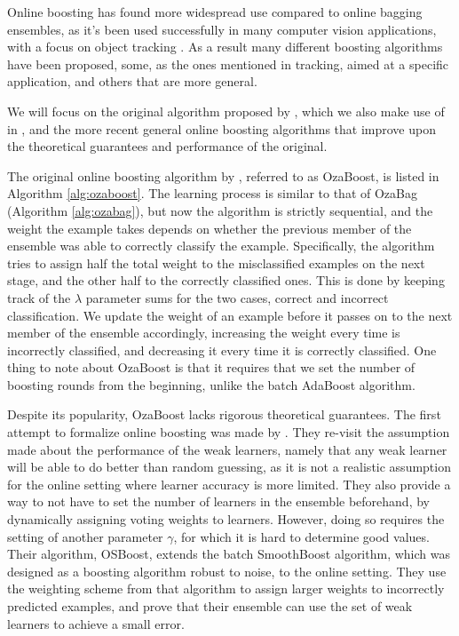 Online boosting has found more widespread use compared to online bagging ensembles,
as it's been used successfully in many computer vision applications, with a focus on
object tracking \cite{online-boost-cv4, online-boost-cv, online-boost-cv3, online-boost-cv2, online-boost-cv5, online-boost-cv-6}.
As a result many different boosting algorithms have been proposed, some, as the ones
mentioned in tracking, aimed at a specific application, and others that are more general.

We will focus on the original algorithm proposed by \citeauthor{Oza2001online},
which we also make use of in \boostvht,
and the more recent general online boosting algorithms that improve upon the
theoretical guarantees and performance of the original.

The original online boosting algorithm by \citeauthor{Oza2001online}, referred to as
OzaBoost, is listed
in Algorithm \ref{alg:ozaboost}.
The learning process is similar to that of OzaBag (Algorithm \ref{alg:ozabag}), but now the
algorithm is strictly sequential, and the weight the example takes depends on whether
the previous member of the ensemble was able to correctly classify the example.
Specifically, the algorithm tries to assign half the total weight to the misclassified
examples on the next stage, and the other half to the correctly classified ones.
This is done by keeping track of the $\lambda$ parameter sums for the two cases,
correct and incorrect classification. We update the weight of an example
before it passes on to the next member of the ensemble accordingly, increasing
the weight every time is incorrectly classified, and decreasing it every time it
is correctly classified.  One thing to note about OzaBoost is that it requires
that we set the number of boosting rounds from the beginning, unlike the
batch AdaBoost algorithm.

Despite its popularity, OzaBoost lacks rigorous theoretical guarantees.
The first attempt to formalize online boosting was made by \citet{online-boosting-theoretical}.
They re-visit the assumption made about the performance of the weak
learners, namely that any weak learner will be able to
do better than random guessing, as it is not a realistic assumption
for the online setting where learner accuracy is more limited. They also
provide a way to not have to set the number of learners in the ensemble beforehand,
by dynamically assigning voting weights to learners.
However, doing so requires the setting of another parameter $\gamma$,
for which it is hard to determine good values.
Their algorithm, OSBoost,
extends the batch SmoothBoost \cite{smoothboost} algorithm, which
was designed as a boosting algorithm robust to noise, to the online
setting. They use the weighting scheme from that algorithm to assign
larger weights to incorrectly predicted examples, and prove that
their ensemble can use the set of weak learners to achieve a small
error.

